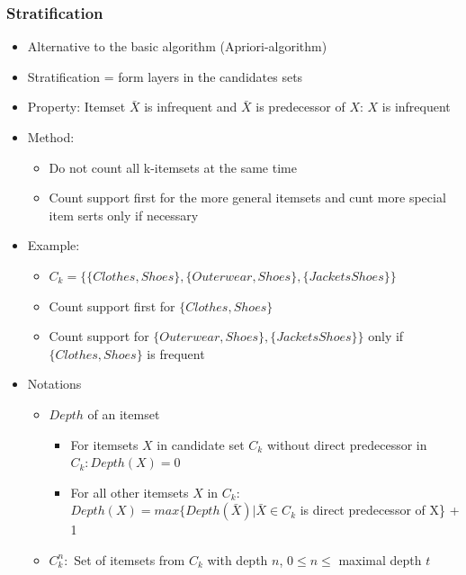 \documentclass{article}
\begin{document}
\subsubsection{Stratification}
\begin{itemize}
  \item Alternative to the basic algorithm (Apriori-algorithm)
  \item Stratification = form layers in the candidates sets
  \item Property: Itemset $\bar{X}$ is infrequent and $\bar{X}$ is predecessor of $X$: $X$ is infrequent

  \item Method:
    \begin{itemize}
      \item Do not count all k-itemsets at the same time
      \item Count support first for the more general itemsets and cunt more special item serts only if necessary
    \end{itemize}

  \item Example:
   \begin{itemize}
      \item $C_k = \{\{Clothes, Shoes\}, \{Outerwear, Shoes\}, \{Jackets Shoes\}\}$
      \item Count support first for $\{Clothes, Shoes\}$
      \item Count support for $\{Outerwear, Shoes\}, \{Jackets Shoes\}\}$ only if $\{Clothes, Shoes\}$ is frequent
    \end{itemize}

  \item Notations
    \begin{itemize}
      \item $Depth$ of an itemset
        \begin{itemize}
          \item For itemsets $X$ in candidate set $C_k$ without direct predecessor in $C_k: Depth(X) = 0$
          \item For all other itemsets $X$ in $C_k$: \\ $Depth(X) = max\{Depth(\bar{X}) | \bar{X} \in C_k $ is direct predecessor of X\} + 1
        \end{itemize}
      \item $C_k^n:$ Set of itemsets from $C_k$ with depth $n$, $0 \le n \le$ maximal depth $t$
    \end{itemize} 


\end{itemize}
\end{document}
